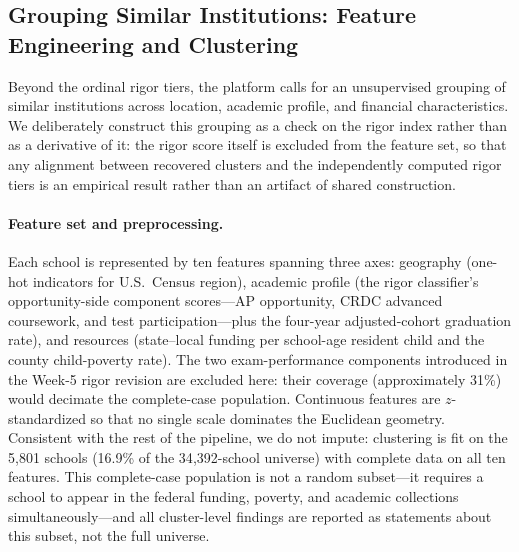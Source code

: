 %
%

\subsection{Grouping Similar Institutions: Feature Engineering and Clustering}\label{sec:clustering}

Beyond the ordinal rigor tiers, the platform calls for an unsupervised grouping of similar
institutions across location, academic profile, and financial characteristics. We deliberately
construct this grouping as a check on the rigor index rather than as a derivative of it: the
rigor score itself is excluded from the feature set, so that any alignment between recovered
clusters and the independently computed rigor tiers is an empirical result rather than an
artifact of shared construction.

\paragraph{Feature set and preprocessing.}
Each school is represented by ten features spanning three axes: geography (one-hot indicators
for U.S.\ Census region), academic profile (the rigor classifier's opportunity-side component
scores---AP opportunity, CRDC advanced coursework, and test participation---plus the four-year
adjusted-cohort graduation rate), and resources (state--local funding per school-age resident
child and the county child-poverty rate). The two exam-performance components introduced in the
Week-5 rigor revision are excluded here: their coverage (approximately 31\%) would decimate the
complete-case population. Continuous features are $z$-standardized so that no single scale
dominates the Euclidean geometry. Consistent with the rest of the pipeline, we do not impute:
clustering is fit on the 5{,}801 schools (16.9\% of the 34{,}392-school universe) with complete
data on all ten features. This complete-case population is not a random subset---it requires a
school to appear in the federal funding, poverty, and academic collections simultaneously---and
all cluster-level findings are reported as statements about this subset, not the full universe.

